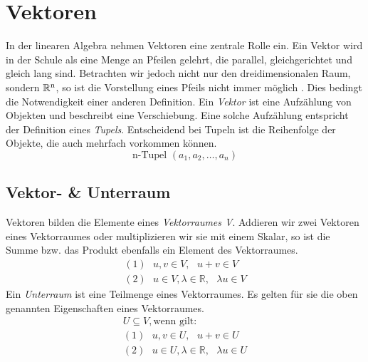 


%

\section{Vektoren}
In der linearen Algebra nehmen Vektoren eine zentrale Rolle ein. Ein Vektor wird in der Schule als eine Menge an Pfeilen gelehrt, die parallel, gleichgerichtet und gleich lang sind. Betrachten wir jedoch nicht nur den dreidimensionalen Raum, sondern $\mathbb{R}\textsuperscript{n}$, so ist die Vorstellung eines Pfeils nicht immer m\"oglich . Dies bedingt die Notwendigkeit einer anderen Definition.
\newline
\indent Ein \textit{Vektor} ist eine Aufz\"ahlung von Objekten und beschreibt eine Verschiebung. Eine solche Aufz\"ahlung entspricht der Definition eines \textit{Tupels}. Entscheidend bei Tupeln ist die Reihenfolge der Objekte, die auch mehrfach vorkommen k\"onnen.
\begin{equation*}
\text{n-Tupel } (a_1,a_2,\dots,a_n)
\end{equation*}
\subsection{Vektor- \& Unterraum}
Vektoren bilden die Elemente eines \textit{Vektorraumes V}. Addieren wir zwei Vektoren eines Vektorraumes oder multiplizieren wir sie mit einem Skalar, so ist die Summe bzw. das Produkt ebenfalls ein Element des Vektorraumes.
\begin{align*}
(1)\text{ }u, v \in V,\text{ } u+v \in V  \\
(2)\text{ }u \in V, \lambda \in \mathbb{R} ,\text{ }\lambda u \in V
\end{align*}
Ein \textit{Unterraum} ist eine Teilmenge eines Vektorraumes. Es gelten f\"ur sie die oben genannten Eigenschaften eines Vektorraumes.
\begin{align*}
U\subseteq V, \text{wenn gilt:}	\\
(1)\text{ }u, v \in U,\text{ } u+v \in U  \\
(2)\text{ }u \in U, \lambda \in \mathbb{R} ,\text{ }\lambda u \in U
\end{align*}
